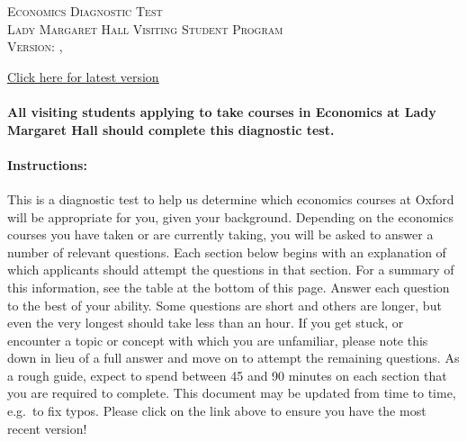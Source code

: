 \documentclass[addpoints,12pt,a4paper]{exam}
\begin{document}
\begin{center}

  \textsc{\Large Economics Diagnostic Test \\ \normalsize Lady Margaret Hall Visiting Student Program \\ \vspace{0.5em} Version: \DTMtoday, \DTMcurrenttime}

  \vspace{1em}

  \href{https://raw.githubusercontent.com/fditraglia/lmh-econ-diagnostic/main/lmh-econ-diagnostic.pdf}{\underline{Click here for latest version}}

\vspace{5em}



\end{center}

\vspace{2em}

\paragraph{All visiting students applying to take courses in Economics at Lady Margaret Hall should complete this diagnostic test.}

\vspace{2em}

\paragraph{Instructions:} This is a diagnostic test to help us determine which economics courses at Oxford will be appropriate for you, given your background. Depending on the economics courses you have taken or are currently taking, you will be asked to answer a number of relevant questions. Each section below begins with an explanation of which applicants should attempt the questions in that section. For a summary of this information, see the table at the bottom of this page. Answer each question to the best of your ability. Some questions are short and others are longer, but even the very longest should take less than an hour. If you get stuck, or encounter a topic or concept with which you are unfamiliar, please note this down in lieu of a full answer and move on to attempt the remaining questions. As a rough guide, expect to spend between 45 and 90 minutes on each section that you are required to complete. This document may be updated from time to time, e.g.\ to fix typos. Please click on the link above to ensure you have the most recent version!
\end{document}

